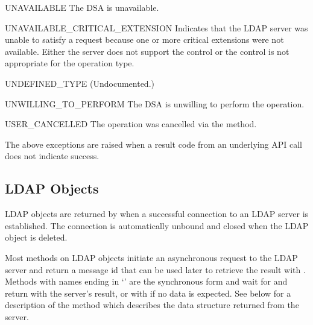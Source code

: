 \begin{excdesc}{UNAVAILABLE}
The DSA is unavailable.
\end{excdesc}
\begin{excdesc}{UNAVAILABLE_CRITICAL_EXTENSION}
Indicates that the LDAP server was unable to satisfy a request
because one or more critical extensions were not available. Either
the server does not support the control or the control is not appropriate
for the operation type.
\end{excdesc}
\begin{excdesc}{UNDEFINED_TYPE}
(Undocumented.)
\end{excdesc}
\begin{excdesc}{UNWILLING_TO_PERFORM}
The  DSA  is  unwilling to perform the operation.
\end{excdesc}
\begin{excdesc}{USER_CANCELLED}
The operation was cancelled via the  method.
\end{excdesc}

The above exceptions are raised when a result code from an underlying API
call does not indicate success.

%

\subsection{LDAP Objects \label{ldap-objects}}


LDAP objects are returned by  when a successful
connection to an LDAP server is established.
The connection is automatically unbound and closed 
when the LDAP object is deleted.

Most methods on LDAP objects
initiate an asynchronous request to the LDAP server 
and return a message id that can be used later to retrieve the result
with . 
Methods with names ending in `' are the synchronous form 
and wait for and return with the server's result, or with
 if no data is expected.
See below for a description of the  method 
which describes the data structure returned from the server.

